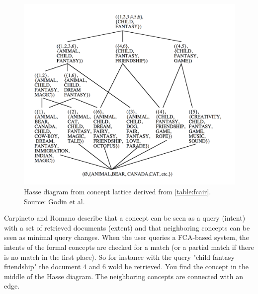 \documentclass[11pt]{report}
\begin{document}
\begin{figure}[!ht]
	\centering
	\includegraphics[width=\linewidth]{./images/fcair}
\caption{Hasse diagram from concept lattice derived from \ref{table:fcair}. Source: Godin et al. \cite{Godin1993}}
\label{figure:fcair}
\end{figure}

Carpineto and Romano \cite{Carpineto2005} describe that a concept can be seen as a query (intent) with a set of retrieved documents (extent) and that neighboring concepts can be seen as minimal query changes. When the user queries a FCA-based system, the intents of the formal concepts are checked for a match (or a partial match if there is no match in the first place). So for instance with the query "child fantasy friendship" the document 4 and 6 wold be retrieved. You find the concept in the middle of the Hasse diagram. The neighboring concepts are connected with an edge. \\
\end{document}
